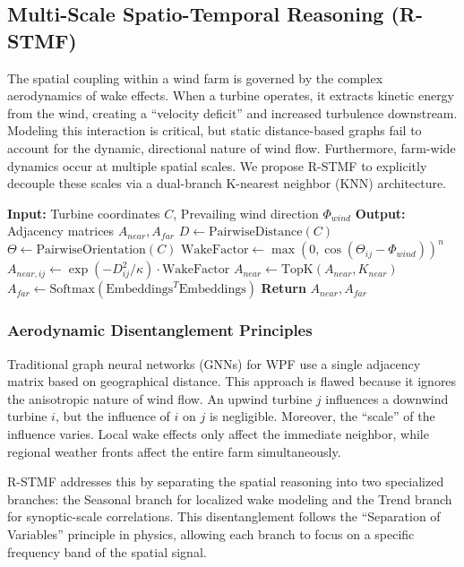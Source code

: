 \subsection{Multi-Scale Spatio-Temporal Reasoning (R-STMF)}
\label{sec:rstmf}
The spatial coupling within a wind farm is governed by the complex aerodynamics of wake effects. When a turbine operates, it extracts kinetic energy from the wind, creating a ``velocity deficit'' and increased turbulence downstream. Modeling this interaction is critical, but static distance-based graphs fail to account for the dynamic, directional nature of wind flow. Furthermore, farm-wide dynamics occur at multiple spatial scales. We propose R-STMF to explicitly decouple these scales via a dual-branch K-nearest neighbor (KNN) architecture.

\begin{algorithm}[H]
\caption{R-STMF Dual-Branch Graph Construction}
\begin{algorithmic}[1]
\STATE \textbf{Input:} Turbine coordinates $C$, Prevailing wind direction $\Phi_{wind}$
\STATE \textbf{Output:} Adjacency matrices $A_{near}, A_{far}$
\STATE $D \gets \text{PairwiseDistance}(C)$
\STATE $\Theta \gets \text{PairwiseOrientation}(C)$
    \STATE $\text{WakeFactor} \gets \max(0, \cos(\Theta_{ij} - \Phi_{wind}))^n$
    \STATE $A_{near, ij} \gets \exp(-D_{ij}^2/\kappa) \cdot \text{WakeFactor}$
\ENDFOR
\STATE $A_{near} \gets \text{TopK}(A_{near}, K_{near})$
\STATE $A_{far} \gets \text{Softmax}(\text{Embeddings}^T \text{Embeddings})$
\STATE \textbf{Return} $A_{near}, A_{far}$
\end{algorithmic}
\label{alg:rstmf_graphs}
\end{algorithm}

\subsubsection{Aerodynamic Disentanglement Principles}
\label{sec:rstmf_aerodynamics}
Traditional graph neural networks (GNNs) for WPF use a single adjacency matrix based on geographical distance. This approach is flawed because it ignores the anisotropic nature of wind flow. An upwind turbine $j$ influences a downwind turbine $i$, but the influence of $i$ on $j$ is negligible. Moreover, the ``scale'' of the influence varies. Local wake effects only affect the immediate neighbor, while regional weather fronts affect the entire farm simultaneously. 

R-STMF addresses this by separating the spatial reasoning into two specialized branches: the Seasonal branch for localized wake modeling and the Trend branch for synoptic-scale correlations. This disentanglement follows the ``Separation of Variables'' principle in physics, allowing each branch to focus on a specific frequency band of the spatial signal.

